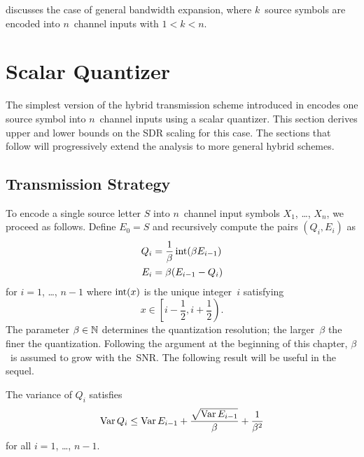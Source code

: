  discusses the case of general bandwidth expansion, where
$k$~source symbols are encoded into $n$~channel inputs with $1 < k < n$. 








\section{Scalar Quantizer}\label{sec:scalarquant}

The simplest version of the hybrid transmission scheme introduced in
 encodes one source symbol into $n$~channel inputs using a
scalar quantizer. This section derives upper and lower bounds on the SDR
scaling for this case. The sections that follow will progressively extend the
analysis to more general hybrid schemes.


\subsection{Transmission Strategy}\label{sec:commscheme}

To encode a single source letter $S$ into $n$~channel input symbols $X_1$,
\dots, $X_n$, we proceed as follows. Define $E_0 = S$ and recursively compute
the pairs $(Q_i, E_i)$ as
\begin{align}
  Q_i &= \frac{1}{\beta}\operatorname{int}(\beta E_{i-1}) \nonumber \\
  E_i &= \beta (E_{i-1} - Q_i) \label{eq:QEdef}
\end{align}
for $i = 1$, \dots, $n-1$ where $\operatorname{int}(x)$ is the unique integer~$i$ satisfying
\begin{equation*}
  x \in \left[i - \frac12, i +\frac12\right).
\end{equation*}
The parameter $\beta \in
{\mathbb{N}}$ determines the quantization resolution; the larger~$\beta$ the finer the
quantization. Following the argument at the beginning of this chapter,
$\beta$~is assumed to grow with the~SNR. The following result will be useful in
the sequel.

\begin{lemma}
  \label{lem:Qvarbound}
  The variance of $Q_i$ satisfies
  \begin{equation*}
    \operatorname{Var} Q_i \le \operatorname{Var} E_{i-1} + \frac{\sqrt{\operatorname{Var} E_{i-1}}}{\beta} +
    \frac{1}{\beta^2}
  \end{equation*}
  for all $i = 1$, \dots, $n-1$. 
\end{lemma}

